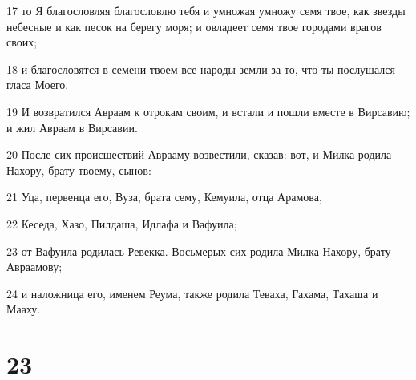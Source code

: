 \par 17 то Я благословляя благословлю тебя и умножая умножу семя твое, как звезды небесные и как песок на берегу моря; и овладеет семя твое городами врагов своих;
\par 18 и благословятся в семени твоем все народы земли за то, что ты послушался гласа Моего.
\par 19 И возвратился Авраам к отрокам своим, и встали и пошли вместе в Вирсавию; и жил Авраам в Вирсавии.
\par 20 После сих происшествий Аврааму возвестили, сказав: вот, и Милка родила Нахору, брату твоему, сынов:
\par 21 Уца, первенца его, Вуза, брата сему, Кемуила, отца Арамова,
\par 22 Кеседа, Хазо, Пилдаша, Идлафа и Вафуила;
\par 23 от Вафуила родилась Ревекка. Восьмерых сих родила Милка Нахору, брату Авраамову;
\par 24 и наложница его, именем Реума, также родила Теваха, Гахама, Тахаша и Мааху.

\chapter{23}

